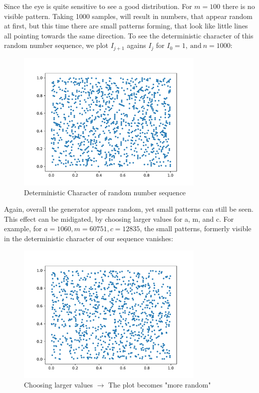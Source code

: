 \documentclass{article}
\begin{document}
Since the eye is quite sensitive to see a good distribution. For \( m = 100\) 
there is no visible pattern. Taking 1000 samples, will result in numbers, that
appear random at first, but this time there are small patterns forming, that
look like little lines all pointing towards the same direction.
To see the deterministic character of this random number sequence, we plot
\( I _{j + 1} \) agains \( I _{j} \) for \( I_0 = 1, \ \text{and} \ n = 1000 \):
\begin{figure}[H]
    \centering
    \includegraphics[width=9cm]{Fig1-3.pdf}
    \caption{Deterministic Character of random number sequence}
\end{figure}
Again, overall the generator appears random, yet small patterns can still be seen.
This effect can be midigated, by choosing larger values for a, m, and c.
For example, for \( a = 1060, m = 60751, c = 12835 \), the small patterns,
formerly visible in the deterministic character of our sequence vanishes:
\begin{figure}[H]
    \centering
    \includegraphics[width=9cm]{Fig1-4.pdf}
    \caption{Choosing larger values $\rightarrow$ The plot becomes "more random"}
\end{figure}
\end{document}
